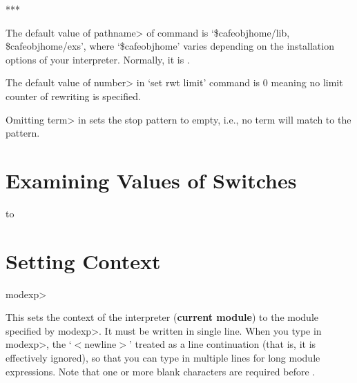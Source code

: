 {%
 {}
***
}

The default value of \<pathname> of  command is
`\$cafeobjhome/lib, \$cafeobjhome/exs',
where `\$cafeobjhome' varies depending on the installation options
of your interpreter. Normally, it is .

The default value of \<number> in `set rwt limit' command is 0 meaning
no limit counter of rewriting is specified.

Omitting \<term> in  sets the stop pattern to
empty, i.e., no term will match to the pattern.

\section{Examining Values of Switches}

\paralign to 
\section{Setting Context}

 {\<modexp>}

This sets the context of the interpreter ({\bf current module})
to the module specified by \<modexp>.
It must be written in single line. 
When you type in \<modexp>, the `\kbd{;}$<$newline$>$' treated as a
line continuation (that is, it is effectively ignored), so that you
can type in multiple lines for long module expressions. Note that one
or more blank characters are required before \kbd{;}.

